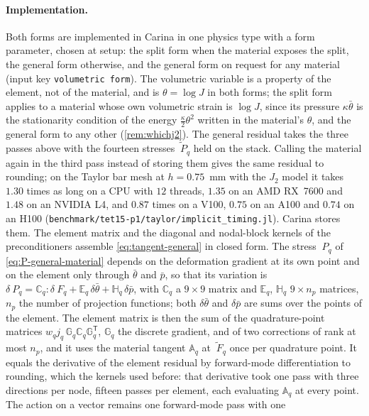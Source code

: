 \documentclass{article}
\newcommand{\F}{~F}
\renewcommand{\P}{~P}
\newcommand{\code}[1]{\texttt{#1}}
\theoremstyle{definition}
\theoremstyle{plain}
\begin{document}
\paragraph{Implementation.} Both forms are implemented in Carina in one
physics type with a form parameter, chosen at setup: the split form when
the material exposes the split, the general form otherwise, and the
general form on request for any material (input key \code{volumetric
form}). The volumetric variable is a property of the element, not of the
material, and is $\theta = \log J$ in both forms; the split form applies to
a material whose own volumetric strain is $\log J$, since its pressure
$\kappa\bar\theta$ is the stationarity condition of the energy
$\tfrac{\kappa}{2}\theta^2$ written in the material's $\theta$, and the
general form to any other (\cref{rem:whichj2}). The general residual takes the three
passes above with the fourteen stresses $\tilde{\P}_q$ held on the stack.
Calling the material again in the third pass instead of storing them gives
the same residual to rounding; on the Taylor bar mesh at $h = 0.75$~mm with
the $J_2$ model it takes $1.30$ times as long on a CPU with $12$ threads,
$1.35$ on an AMD RX~7600 and $1.48$ on an NVIDIA L4, and $0.87$ times on a
V100, $0.75$ on an A100 and $0.74$ on an H100
(\code{benchmark/tet15-p1/taylor/implicit\_timing.jl}). Carina stores them.
The element matrix and the diagonal and nodal-block kernels of the
preconditioners assemble \eqref{eq:tangent-general} in closed form. The
stress $\P_q$ of \eqref{eq:P-general-material} depends on the deformation
gradient at its own point and on the element only through $\bar\theta$ and
$\bar p$, so that its variation is $\delta\P_q = \mathbb{C}_q : \delta\F_q
+ \mathbb{E}_q\,\delta\bar\theta + \mathbb{H}_q\,\delta\bar p$, with
$\mathbb{C}_q$ a $9\times9$ matrix and $\mathbb{E}_q$, $\mathbb{H}_q$
$9\times n_p$ matrices, $n_p$ the number of projection functions; both
$\delta\bar\theta$ and $\delta\bar p$ are sums over the points of the
element. The element matrix is then the sum of the quadrature-point
matrices $w_q j_q\, \mathbb{G}_q \mathbb{C}_q \mathbb{G}_q^{\mathsf T}$,
$\mathbb{G}_q$ the discrete gradient, and of two corrections of rank at
most $n_p$, and it uses the material tangent $\mathbb{A}_q$ at
$\tilde{\F}_q$ once per quadrature point. It equals the derivative of the
element residual by forward-mode differentiation to rounding, which the
kernels used before: that derivative took one pass with three directions
per node, fifteen passes per element, each evaluating $\mathbb{A}_q$ at
every point. The action on a vector remains one forward-mode pass with one
\end{document}

